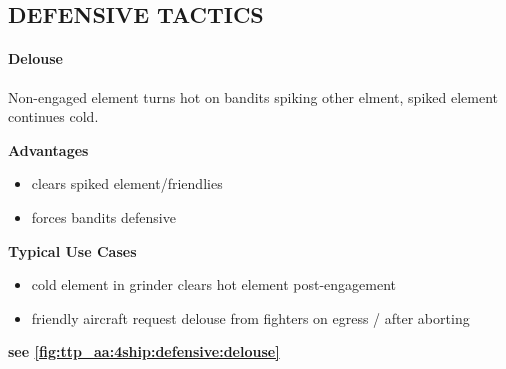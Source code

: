 \clearpage

\subsection{DEFENSIVE TACTICS}

\paragraph{Delouse} 
Non-engaged element turns hot on bandits spiking other elment,
spiked element continues cold.

\bigskip
\textbf{Advantages}
\begin{itemize}
    \item clears spiked element/friendlies
    \item forces bandits defensive
\end{itemize}

\textbf{Typical Use Cases}
\begin{itemize}
    \item cold element in grinder clears hot element post-engagement
    \item friendly aircraft request delouse from fighters on egress / after aborting
\end{itemize}

\hfill\textbf{see \cref{fig:ttp_aa:4ship:defensive:delouse}}


